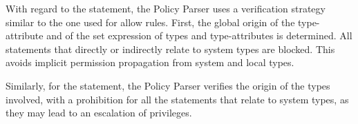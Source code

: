 With regard to the \typeattributeset statement, the \pap Policy Parser
uses a verification strategy similar to the one used for allow rules.
First, the global origin of the type-attribute and of the set
expression of types and type-attributes is determined.  All statements
that directly or indirectly relate to system types are blocked.  This
avoids implicit permission propagation from system and local types.

Similarly, for the \typetransition statement, the \pap Policy Parser
verifies the origin of the types involved, with a prohibition for all
the statements that relate to system types, as they may lead to an
escalation of privileges.


